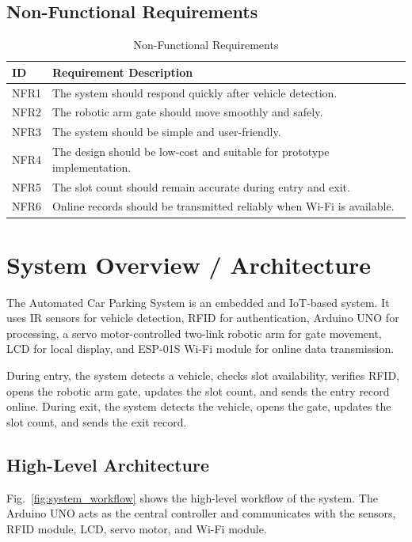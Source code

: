 \subsection{Non-Functional Requirements}

\begin{table}[H]
\centering
\small
\caption{Non-Functional Requirements}
\label{tab:nonfunctional_requirements}
\begin{tabular}{p{2.2cm} p{11cm}}
\toprule
\textbf{ID} & \textbf{Requirement Description} \\
\midrule
NFR1 & The system should respond quickly after vehicle detection. \\
NFR2 & The robotic arm gate should move smoothly and safely. \\
NFR3 & The system should be simple and user-friendly. \\
NFR4 & The design should be low-cost and suitable for prototype implementation. \\
NFR5 & The slot count should remain accurate during entry and exit. \\
NFR6 & Online records should be transmitted reliably when Wi-Fi is available. \\
\bottomrule
\end{tabular}
\normalsize
\end{table}

\section{System Overview / Architecture}

The Automated Car Parking System is an embedded and IoT-based system. It uses IR sensors for vehicle detection, RFID for authentication, Arduino UNO for processing, a servo motor-controlled two-link robotic arm for gate movement, LCD for local display, and ESP-01S Wi-Fi module for online data transmission.

During entry, the system detects a vehicle, checks slot availability, verifies RFID, opens the robotic arm gate, updates the slot count, and sends the entry record online. During exit, the system detects the vehicle, opens the gate, updates the slot count, and sends the exit record.

\subsection{High-Level Architecture}

Fig.~\ref{fig:system_workflow} shows the high-level workflow of the system. The Arduino UNO acts as the central controller and communicates with the sensors, RFID module, LCD, servo motor, and Wi-Fi module.

